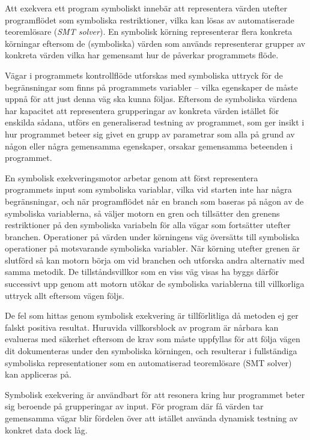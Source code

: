 Att exekvera ett program symboliskt innebär att representera värden utefter 
programflödet som symboliska restriktioner, vilka kan lösas av automatiserade 
teoremlösare (\emph{SMT solver}). En symbolisk körning representerar flera konkreta 
körningar eftersom de (symboliska) värden som används representerar grupper av 
konkreta värden vilka har gemensamt hur de påverkar programmets flöde. 

Vägar i programmets kontrollflöde utforskas med symboliska uttryck för de 
begränsningar som finns på programmets variabler -- vilka egenskaper de måste uppnå 
för att just denna väg ska kunna följas. Eftersom de symboliska värdena har kapacitet 
att representera grupperingar av konkreta värden istället för enskilda sådana, 
utförs en generaliserad testning av programmet, som ger insikt i hur programmet 
beteer sig givet en grupp av parametrar som alla på grund av någon eller några 
gemensamma egenskaper, orsakar gemensamma beteenden i programmet. 

En symbolisk exekveringsmotor arbetar genom att först representera programmets input 
som symboliska variablar, vilka vid starten inte har några begränsningar, och när 
programflödet når en branch som baseras på någon av de symboliska variablerna, 
så väljer motorn en gren och tillsätter den grenens restriktioner på den symboliska 
variabeln för alla vägar som fortsätter utefter branchen. Operationer på värden 
under körningens väg översätts till symboliska operationer på motsvarande symboliska 
variabler. \cite{klee} När körning utefter grenen är slutförd så kan motorn börja om 
vid branchen och utforska andra alternativ med samma metodik. De tillståndsvillkor 
som en viss väg visas ha byggs därför successivt upp genom att motorn utökar de 
symboliska variablerna till villkorliga uttryck allt eftersom vägen följs. 

De fel som hittas genom symbolisk exekvering är tillförlitliga då metoden ej ger falskt 
positiva resultat. Huruvida villkorsblock av program är nårbara kan evalueras med 
säkerhet eftersom de krav som måste uppfyllas för att följa vägen dit dokumenteras under 
den symboliska körningen, och resulterar i fullständiga symboliska representationer 
som en automatiserad teoremlösare (SMT solver) kan appliceras på. 

Symbolisk exekvering är användbart för att resonera kring hur programmet beter sig 
beroende på grupperingar av input. För program där få värden tar gemensamma vägar blir 
fördelen över att istället använda dynamisk testning av konkret data dock låg. 

